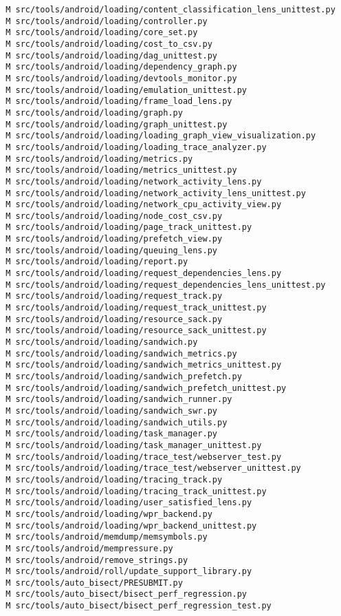 \documentclass{article}
\begin{document}
\begin{verbatim}
 M src/tools/android/loading/content_classification_lens_unittest.py
 M src/tools/android/loading/controller.py
 M src/tools/android/loading/core_set.py
 M src/tools/android/loading/cost_to_csv.py
 M src/tools/android/loading/dag_unittest.py
 M src/tools/android/loading/dependency_graph.py
 M src/tools/android/loading/devtools_monitor.py
 M src/tools/android/loading/emulation_unittest.py
 M src/tools/android/loading/frame_load_lens.py
 M src/tools/android/loading/graph.py
 M src/tools/android/loading/graph_unittest.py
 M src/tools/android/loading/loading_graph_view_visualization.py
 M src/tools/android/loading/loading_trace_analyzer.py
 M src/tools/android/loading/metrics.py
 M src/tools/android/loading/metrics_unittest.py
 M src/tools/android/loading/network_activity_lens.py
 M src/tools/android/loading/network_activity_lens_unittest.py
 M src/tools/android/loading/network_cpu_activity_view.py
 M src/tools/android/loading/node_cost_csv.py
 M src/tools/android/loading/page_track_unittest.py
 M src/tools/android/loading/prefetch_view.py
 M src/tools/android/loading/queuing_lens.py
 M src/tools/android/loading/report.py
 M src/tools/android/loading/request_dependencies_lens.py
 M src/tools/android/loading/request_dependencies_lens_unittest.py
 M src/tools/android/loading/request_track.py
 M src/tools/android/loading/request_track_unittest.py
 M src/tools/android/loading/resource_sack.py
 M src/tools/android/loading/resource_sack_unittest.py
 M src/tools/android/loading/sandwich.py
 M src/tools/android/loading/sandwich_metrics.py
 M src/tools/android/loading/sandwich_metrics_unittest.py
 M src/tools/android/loading/sandwich_prefetch.py
 M src/tools/android/loading/sandwich_prefetch_unittest.py
 M src/tools/android/loading/sandwich_runner.py
 M src/tools/android/loading/sandwich_swr.py
 M src/tools/android/loading/sandwich_utils.py
 M src/tools/android/loading/task_manager.py
 M src/tools/android/loading/task_manager_unittest.py
 M src/tools/android/loading/trace_test/webserver_test.py
 M src/tools/android/loading/trace_test/webserver_unittest.py
 M src/tools/android/loading/tracing_track.py
 M src/tools/android/loading/tracing_track_unittest.py
 M src/tools/android/loading/user_satisfied_lens.py
 M src/tools/android/loading/wpr_backend.py
 M src/tools/android/loading/wpr_backend_unittest.py
 M src/tools/android/memdump/memsymbols.py
 M src/tools/android/mempressure.py
 M src/tools/android/remove_strings.py
 M src/tools/android/roll/update_support_library.py
 M src/tools/auto_bisect/PRESUBMIT.py
 M src/tools/auto_bisect/bisect_perf_regression.py
 M src/tools/auto_bisect/bisect_perf_regression_test.py

\end{verbatim}
\end{document}
